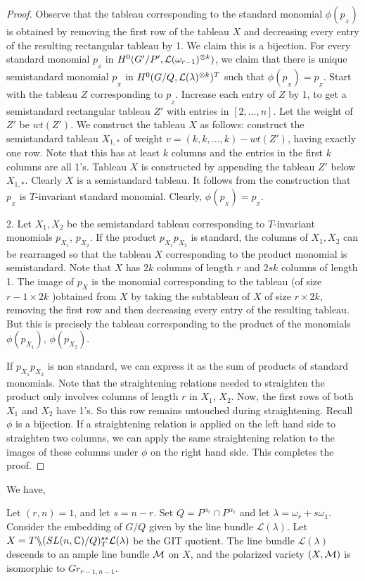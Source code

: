 \begin{proof}
    Observe that the tableau corresponding to the standard monomial \(\phi(p_{_X})\) is obtained by removing the first row of the tableau \(X\) and decreasing every entry of the resulting rectangular tableau by 1. We claim this is a bijection. For every standard monomial \(p_{_Z}\) in \(H^0(G'/P', {\cal L}(\omega_{r-1})^{\otimes k})\), we claim that there is unique semistandard monomial \(p_{_X}\) in \(H^0(G/Q,{\cal L}(\lambda)^{\otimes k})^T\) such that \(\phi(p_{_X})=p_{_Z}\). Start with the tableau $Z$ corresponding to  \(p_{_Z}\). Increase each entry of $Z$ by 1, to get a semistandard rectangular tableau $Z'$ with entries in $[2,\ldots,n]$. Let the weight of $Z'$ be $wt(Z')$.  We construct the tableau \(X\) as follows: construct the semistandard tableau \(X_{1,*}\) of weight \(v = (k,k,...,k) - wt(Z')\), having exactly one row. Note that this has at least $k$ columns and the entries in the first $k$ columns are all 1's. Tableau \(X\) is constructed by appending the tableau \(Z'\) below \(X_{1,*}\). Clearly $X$ is a semistandard tableau. It follows from the construction that \(p_{_X}\) is \(T\)-invariant standard monomial. Clearly, \(\phi(p_{_X}) = p_{_Z}\).

2. Let $X_1, X_2$ be the semistandard tableau corresponding to $T$-invariant monomials $p_{X_1}$, $p_{X_2}$.  If the product $p_{X_1}p_{X_2}$ is standard, the columns of
$X_1, X_2$ can be rearranged so that the tableau $X$ corresponding to the product monomial is semistandard. Note that $X$ has $2k$ columns of
length $r$ and $2sk$ columns of length 1. The image of $p_X$ is the monomial corresponding to the tableau (of size $r-1 \times 2k$ )obtained from $X$ by taking the subtableau of $X$ of size $r \times 2k$, removing the first row and then decreasing every entry of the resulting tableau. But this is precisely the tableau corresponding to the product of
the monomials $\phi(p_{X_1})$, $\phi(p_{X_2})$.

If $p_{X_1}p_{X_2}$ is non standard, we can express it as the sum of products of 
standard monomials. Note that the straightening relations needed to straighten the product only involves columns of length $r$ in $X_1$, $X_2$. Now, the first rows of both $X_1$ and $X_2$ have 1's. So this row remains untouched during straightening. Recall $\phi$ is a bijection. If a straightening relation is applied on the left hand side to straighten two columns, we can apply the same straightening relation to the images of these columns under $\phi$ on the right hand side.  This completes the proof.
\end{proof}
We have,
\begin{theorem}
Let $(r,n)=1$, and let $s=n-r$. Set $Q = P^{\alpha_r} \cap P^{\alpha_1}$ and let $\lambda = \omega_r + s\omega_1$. Consider the embedding of $G/Q$ given by the line bundle ${\mathcal L}(\lambda)$. Let $X = T \backslash\mkern-6mu\backslash (SL(n,\mathbb{C})/Q)^{ss}_T {\cal L}(\lambda)$ be the GIT quotient. The line bundle ${\mathcal L}(\lambda)$ descends to an ample line bundle ${\cal M}$ on $X$, and the polarized variety $(X,{\cal M})$ is isomorphic to $Gr_{r-1, n-1}$.

\end{theorem}

